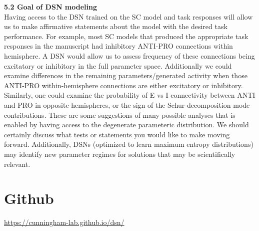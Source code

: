 \documentclass[11pt]{article}
\begin{document}
\textbf{5.2 Goal of DSN modeling} \\
Having access to the DSN trained on the SC model and task responses will allow us to make affirmative statements about the model with the desired task performance.  For example, most SC models that produced the appropriate task responses in the manuscript had inhibitory ANTI-PRO connections within hemisphere.  A DSN would allow us to assess frequency of these connections being excitatory or inhibitory in the full parameter space.  Additionally we could examine differences in the remaining parameters/generated activity when those ANTI-PRO within-hemisphere connections are either excitatory or inhibitory. Similarly, one could examine the probability of E vs I connectivity between ANTI and PRO in opposite hemispheres, or the sign of the Schur-decomposition mode contributions. These are some suggestions of many possible analyses that is enabled by having access to the degenerate parameteric distribution.  We should certainly discuss what tests or statements you would like to make moving forward.  Additionally, DSNs (optimized to learn maximum entropy distributions) may identify new parameter regimes for solutions that may be scientifically relevant.


\section{Github}
{\color{blue} \href{https://cunningham-lab.github.io/dsn/}{https://cunningham-lab.github.io/dsn/}} \\



\end{document}

